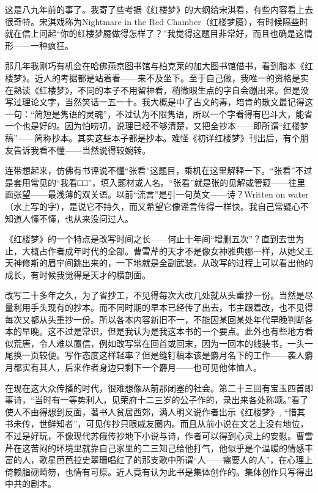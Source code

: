 \par 这是八九年前的事了。我寄了些考据《红楼梦》的大纲给宋淇看，有些内容看上去很奇特。宋淇戏称为Nightmare in the Red Chamber（红楼梦魇），有时候隔些时就在信上问起“你的红楼梦魇做得怎样了？”我觉得这题目非常好，而且也确是这情形——一种疯狂。
\par 那几年我刚巧有机会在哈佛燕京图书馆与柏克莱的加大图书馆借书，看到脂本《红楼梦》。近人的考据都是站着看——来不及坐下。至于自己做，我唯一的资格是实在熟读《红楼梦》，不同的本子不用留神看，稍微眼生点的字自会蹦出来。但是没写过理论文字，当然笑话一五一十。我大概是中了古文的毒，培肯的散文最记得这一句：“简短是隽语的灵魂”，不过认为不限隽语，所以一个字看得有巴斗大，能省一个也是好的。因为怕唠叨，说理已经不够清楚，又把全抄本——即所谓“红楼梦稿”——简称抄本。其实这些本子都是抄本。难怪《初详红楼梦》刊出后，有个朋友告诉我看不懂——当然说得较婉转。
\par 连带想起来，仿佛有书评说不懂“张看”这题目，乘机在这里解释一下。“张看”不过是套用常见的“我看□□”，填入题材或人名。“张看”就是张的见解或管窥——往里面张望——最浅薄的双关语。以前“流言”是引一句英文——诗？Written on water （水上写的字），是说它不持久，而又希望它像谣言传得一样快。我自己常疑心不知道人懂不懂，也从来没问过人。
\par 《红楼梦》的一个特点是改写时间之长——何止十年间“增删五次”？直到去世为止，大概占作者成年时代的全部。曹雪芹的天才不是像女神雅典娜一样，从她父王天神修斯的眉宇间跳出来的，一下地就是全副武装。从改写的过程上可以看出他的成长，有时候我觉得是天才的横剖面。
\par 改写二十多年之久，为了省抄工，不见得每次大改几处就从头重抄一份。当然是尽量利用手头现有的抄本。而不同时期的早本已经传了出去，书主跟着改，也不见得每次又都从头重抄一份。所以各本内容新旧不一，不能因某回某处年代早晚判断各本的早晚。这不过是常识，但是我认为是我这本书的一个要点。此外也有些地方看似荒唐，令人难以置信，例如改写常在回首或回末，因为一回本的线装书，一头一尾换一页较便。写作态度这样轻率？但是缝钉稿本该是麝月名下的工作——袭人麝月都实有其人，后来作者身边只剩下一个麝月——也可见他体恤人。
\par 在现在这大众传播的时代，很难想像从前那闭塞的社会。第二十三回有宝玉四首即事诗，“当时有一等势利人，见荣府十二三岁的公子作的，录出来各处称颂。”看了使人不由得想到反面，著书人贫居西郊，满人明义说作者出示《红楼梦》, “惜其书未传，世鲜知者”，可见传抄只限戚友圈内。而且从前小说在文艺上没有地位，不过是好玩，不像现代苏俄传抄地下小说与诗，作者可以得到心灵上的安慰。曹雪芹在这苦闷的环境里就靠自己家里的二三知己给他打气，他似乎是个温暖的情感丰富的人，歌星芭芭拉史翠珊唱红了的那支歌中所谓“人——需要人的人”，在心理上倚赖脂砚畸笏，也情有可原。近人竟有认为此书是集体创作的。集体创作只写得出中共的剧本。
